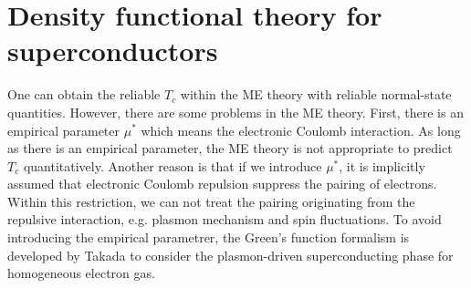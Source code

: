 

\section{Density functional theory for superconductors}
\label{scdft}

One can obtain the reliable $T_c$ within the ME theory with reliable normal-state quantities.
However, there are some problems in the ME theory. First, there is an empirical parameter $\mu^{\ast}$
which means the electronic Coulomb interaction. As long as there is an empirical parameter, 
the ME theory is not appropriate to predict $T_c$ quantitatively.
Another reason is that if we introduce $\mu^{\ast}$, it is implicitly assumed that electronic
Coulomb repulsion suppress the pairing of electrons. Within this restriction, we can not treat the
pairing originating from the repulsive interaction, e.g. plasmon mechanism and spin fluctuations.
To avoid introducing the empirical parametrer, the Green's function formalism is developed by Takada
\cite{Takada1978plasmon} to consider the plasmon-driven superconducting phase for homogeneous electron gas.

